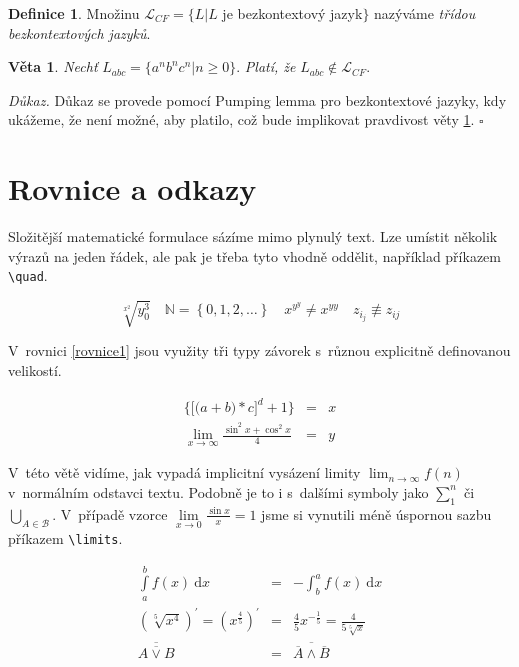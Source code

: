\documentclass[a4paper,11pt,twocolumn]{article}
\theoremstyle{definition}
\newtheorem{definice}{Definice}[section]
\theoremstyle{definition}
\theoremstyle{definition}
\newtheorem{veta}{Věta}
\begin{document}
\begin{definice} Množinu $\mathcal{L}_{CF} = \{L | L$ je bezkontextový jazyk$\}$ nazýváme \emph{třídou bezkontextových jazyků}. \end{definice}

\begin{veta} \label{veta1} \emph{Nechť} $L_{abc} = \{ a^n b^n c^n |n \geq 0\}$. \emph{Platí, že} $L_{abc} \not\in \mathcal{L}_{CF}$. \end{veta}

\parindent=0cm
{\itshape Důkaz.} Důkaz se provede pomocí Pumping lemma pro bezkontextové jazyky, kdy ukážeme, že není možné, aby platilo, což bude implikovat pravdivost věty \ref{veta1}. \hfill $\square$

\parindent=0.5cm
\section{Rovnice a odkazy}

Složitější matematické formulace sázíme mimo plynulý text. Lze umístit několik výrazů na jeden řádek, ale pak je třeba tyto vhodně oddělit, například příkazem \verb|\quad|. 

$$\sqrt[x^2]{y_{0}^3}\quad\mathbb{N} = \left\{0,1,2,\dots\right\}\quad x^{y^{y}} \neq x^{yy} \quad z_{i_{j}} \not\equiv z_{ij}$$

V~rovnici \eqref{rovnice1} jsou využity tři typy závorek s~různou explicitně definovanou velikostí.

\begin{eqnarray}
\bigg\{\Big[\big(a + b\big) * c\Big]^d + 1\bigg\}&=&x\label{rovnice1}\\ 
\lim\limits_{x \to \infty} \frac{\sin^2 x + \cos^2 x}{4}&=&y\nonumber
\end{eqnarray}
 
V~této větě vidíme, jak vypadá implicitní vysázení limity $\lim_{n \to \infty}f(n)$ v~normálním odstavci textu. Podobně je to i s~dalšími symboly jako $\sum_{1}^{n}$ či $\bigcup_{A \in \mathcal{B}}$. V~případě vzorce $\lim\limits_{x \to 0} \frac{\sin x}{x} = 1$ jsme si vynutili méně úspornou sazbu příkazem \verb|\limits|.

\begin{eqnarray}
\displaystyle \int\limits_a^b f(x)\ \mathrm{d}x&=&-\int_b^a f(x)\ \mathrm{d}x\\
\left(\sqrt[5]{x^4}\right)^{\prime}=\left(x^{\frac{4}{5}}\right)^{\prime} &=& \frac{4}{5}x^{-\frac{1}{5}} = \frac{4}{5\sqrt[5]{x}}\\
\overline{\overline{A \lor B}}&=&\overline{\overline{A} \land \overline{B}}
\end{eqnarray}
\end{document}
